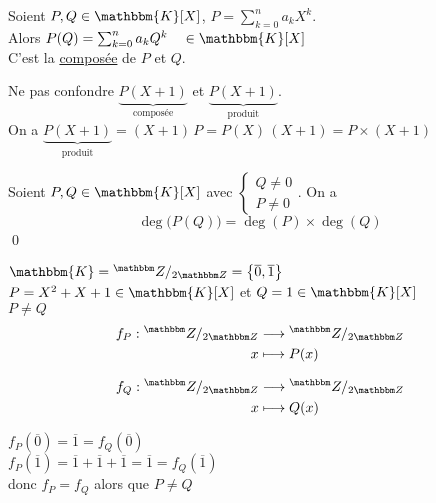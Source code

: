 \begin{defn}
	Soient $P,Q \in \mathbbm{K}[X]$, $P = \sum_{k=0}^n a_k X^k$.\\
	Alors $P(Q) = \sum_{k=0}^n a_k Q^k \quad \in \mathbbm{K}[X]$\\
	C'est la \underline{composée} de $P$ et $Q$.
\end{defn}

\begin{rmk}
	Ne pas confondre $\underbrace{P(X+1)}_{\text{composée}}$ et $\underbrace{P(X+1)}_{\text{produit}}$.\\
	On a $\underbrace{P(X+1)}_{\text{produit}} = (X+1)\,P = P(X)\,(X+1) = P \times (X+1)$
\end{rmk}

\begin{prop}
	Soient $P,Q \in \mathbbm{K}[X]$ avec $\begin{cases}
		Q \neq 0\\
		P\neq 0
	\end{cases}$. On a \[
		\deg\big(P(Q)\big) = \deg(P) \times \deg(Q)
	\] 
	\qed
\end{prop}

\begin{exm}
	$\mathbbm{K} = {}^\Z / {}_{2\Z} = \left\{\overline{0}, \overline{1}\right\}$ \\

	$P = X^2 + X + 1 \in \mathbbm{K}[X]$ et $Q = 1 \in \mathbbm{K}[X]$\\
	$P \neq Q$\\

	\begin{align*}
		f_P: {}^\Z / {}_{2\Z} &\longrightarrow {}^\Z / {}_{2\Z} \\
		x &\longmapsto P(x)
	\end{align*}

	\begin{align*}
		f_Q: {}^\Z / {}_{2\Z} &\longrightarrow {}^\Z / {}_{2\Z} \\
		x &\longmapsto Q(x)
	\end{align*}

	$f_P\left( \overline{0} \right) = \overline{1} = f_Q\left( \overline{0} \right)$ \\
	$f_P\left( \overline{1} \right) = \overline{1} + \overline{1} + \overline{1} = \overline{1} = f_Q\left( \overline{1} \right)$ \\
	donc $f_P = f_Q$ alors que $P \neq Q$
\end{exm}

